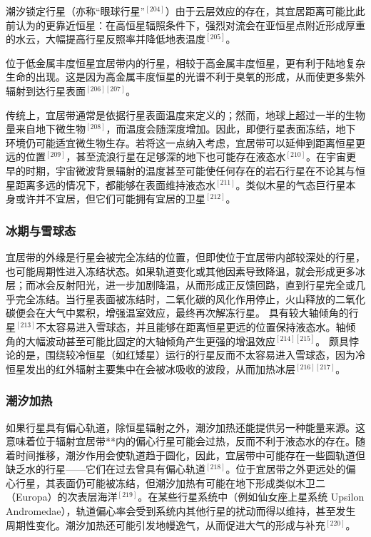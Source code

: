 潮汐锁定行星（亦称“眼球行星”$^{[204]}$）由于云层效应的存在，其宜居距离可能比此前认为的更靠近恒星：在高恒星辐照条件下，强烈对流会在亚恒星点附近形成厚重的水云，大幅提高行星反照率并降低地表温度$^{[205]}$。

位于低金属丰度恒星宜居带内的行星，相较于高金属丰度恒星，更有利于陆地复杂生命的出现。这是因为高金属丰度恒星的光谱不利于臭氧的形成，从而使更多紫外辐射到达行星表面$^{[206][207]}$。

传统上，宜居带通常是依据行星表面温度来定义的；然而，地球上超过一半的生物量来自地下微生物$^{[208]}$，而温度会随深度增加。因此，即便行星表面冻结，地下环境仍可能适宜微生物生存。若将这一点纳入考虑，宜居带可以延伸到距离恒星更远的位置$^{[209]}$，甚至流浪行星在足够深的地下也可能存在液态水$^{[210]}$。在宇宙更早的时期，宇宙微波背景辐射的温度甚至可能使任何存在的岩石行星在不论其与恒星距离多远的情况下，都能够在表面维持液态水$^{[211]}$。类似木星的气态巨行星本身或许并不宜居，但它们可能拥有宜居的卫星$^{[212]}$。
\subsubsection{冰期与雪球态}
宜居带的外缘是行星会被完全冻结的位置，但即使位于宜居带内部较深处的行星，也可能周期性进入冻结状态。如果轨道变化或其他因素导致降温，就会形成更多冰层；而冰会反射阳光，进一步加剧降温，从而形成正反馈回路，直到行星完全或几乎完全冻结。当行星表面被冻结时，二氧化碳的风化作用停止，火山释放的二氧化碳便会在大气中累积，增强温室效应，最终再次解冻行星。
具有较大轴倾角的行星$^{[213]}$不太容易进入雪球态，并且能够在距离恒星更远的位置保持液态水。轴倾角的大幅波动甚至可能比固定的大轴倾角产生更强的增温效应$^{[214][215]}$。
颇具悖论的是，围绕较冷恒星（如红矮星）运行的行星反而不太容易进入雪球态，因为冷恒星发出的红外辐射主要集中在会被冰吸收的波段，从而加热冰层$^{[216][217]}$。
\subsubsection{潮汐加热}
如果行星具有偏心轨道，除恒星辐射之外，潮汐加热还能提供另一种能量来源。这意味着位于辐射宜居带**内的偏心行星可能会过热，反而不利于液态水的存在。随着时间推移，潮汐作用会使轨道趋于圆化，因此，宜居带中可能存在一些圆轨道但缺乏水的行星——它们在过去曾具有偏心轨道$^{[218]}$。位于宜居带之外更远处的偏心行星，其表面仍可能被冻结，但潮汐加热有可能在地下形成类似木卫二（Europa）的次表层海洋$^{[219]}$。在某些行星系统中（例如仙女座上星系统 Upsilon Andromedae），轨道偏心率会受到系统内其他行星的扰动而得以维持，甚至发生周期性变化。潮汐加热还可能引发地幔逸气，从而促进大气的形成与补充$^{[220]}$。
